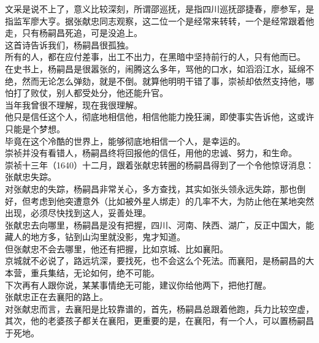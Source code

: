 \begin{multicols}{\theparacolNo}
文采是说不上了，意义比较深刻，所谓邵巡抚，是指四川巡抚邵捷春，廖参军，是指监军廖大亨。据张献忠同志观察，这二位一个是经常来转转，一个是经常跟着他走，只有杨嗣昌死追，可是没追上。\\

这首诗告诉我们，杨嗣昌很孤独。\\

所有的人，都在应付差事，出工不出力，在黑暗中坚持前行的人，只有他而已。\\

在史书上，杨嗣昌是很嚣张的，闹腾这么多年，骂他的口水，如滔滔江水，延绵不绝，然而无论怎么弹劾，就是不倒。就算他明明干错了事，崇祯却依然支持他，哪怕打了败仗，别人都受处分，他还能升官。\\

当年我曾很不理解，现在我很理解。\\

他只是信任这个人，彻底地相信他，相信他能力挽狂澜，即使事实告诉他，这或许只能是个梦想。\\

毕竟在这个冷酷的世界上，能够彻底地相信一个人，是幸运的。\\

崇祯并没有看错人，杨嗣昌终将回报他的信任，用他的忠诚、努力，和生命。\\

崇祯十三年（1640）十二月，跟着张献忠转圈的杨嗣昌得到了一个令他惊讶消息：张献忠失踪。\\

对张献忠的失踪，杨嗣昌非常关心，多方查找，其实如张头领永远失踪，那也倒好，但考虑到他突遭意外（比如被外星人绑走）的几率不大，为防止他在某地突然出现，必须尽快找到这人，妥善处理。\\

张献忠去向哪里，杨嗣昌是没有把握，四川、河南、陕西、湖广，反正中国大，能藏人的地方多，钻到山沟里就没影，鬼才知道。\\

但张献忠不会去哪里，他还有把握，比如京城、比如襄阳。\\

京城就不必说了，路远坑深，要找死，也不会这么个死法。而襄阳，是杨嗣昌的大本营，重兵集结，无论如何，绝不可能。\\

下次再有人跟你说，某某事情绝无可能，建议你给他两下，把他打醒。\\

张献忠正在去襄阳的路上。\\

对张献忠而言，去襄阳是比较靠谱的，首先，杨嗣昌总跟着他跑，兵力比较空虚，其次，他的老婆孩子都关在襄阳，更重要的是，在襄阳，有一个人，可以置杨嗣昌于死地。\\


\end{multicols}
